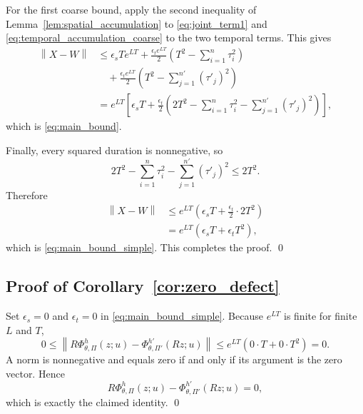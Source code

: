 \documentclass{article}
\theoremstyle{plain}
\theoremstyle{definition}
\theoremstyle{remark}
\newcommand{\PhiOp}{\Phi}
\newcommand{\norm}[1]{\left\lVert #1 \right\rVert}
\begin{document}
For the first coarse bound, apply the second inequality of Lemma~\ref{lem:spatial_accumulation} to \cref{eq:joint_term1} and \cref{eq:temporal_accumulation_coarse} to the two temporal terms. This gives
\begin{align}
\norm{X-W}
&\le
\epsilon_sTe^{LT}
+
\frac{\epsilon_te^{LT}}{2}
\left(T^2-\sum_{i=1}^{n}\tau_i^2\right)
\nonumber\\
&\quad+
\frac{\epsilon_te^{LT}}{2}
\left(T^2-\sum_{j=1}^{n'}(\tau'_j)^2\right)
\nonumber\\
&=
 e^{LT}
 \left[
 \epsilon_sT
 +\frac{\epsilon_t}{2}
 \left(
 2T^2
 -\sum_{i=1}^{n}\tau_i^2
 -\sum_{j=1}^{n'}(\tau'_j)^2
 \right)
 \right],
\end{align}
which is \cref{eq:main_bound}.

Finally, every squared duration is nonnegative, so
\begin{equation}
2T^2
-\sum_{i=1}^{n}\tau_i^2
-\sum_{j=1}^{n'}(\tau'_j)^2
\le 2T^2.
\end{equation}
Therefore
\begin{align}
\norm{X-W}
&\le
 e^{LT}
 \left(\epsilon_sT+\frac{\epsilon_t}{2}\cdot2T^2\right)
\nonumber\\
&=e^{LT}(\epsilon_sT+\epsilon_tT^2),
\end{align}
which is \cref{eq:main_bound_simple}. This completes the proof. \qed

\subsection{Proof of Corollary~\ref{cor:zero_defect}}
\label{app:proof_zero_defect}

Set $\epsilon_s=0$ and $\epsilon_t=0$ in \cref{eq:main_bound_simple}. Because $e^{LT}$ is finite for finite $L$ and $T$,
\begin{equation}
0
\le
\norm{
R\PhiOp^{h}_{\theta,\Pi}(z;u)
-
\PhiOp^{h'}_{\theta,\Pi'}(Rz;u)
}
\le
 e^{LT}(0\cdot T+0\cdot T^2)
=0.
\end{equation}
A norm is nonnegative and equals zero if and only if its argument is the zero vector. Hence
\begin{equation}
R\PhiOp^{h}_{\theta,\Pi}(z;u)
-
\PhiOp^{h'}_{\theta,\Pi'}(Rz;u)
=0,
\end{equation}
which is exactly the claimed identity. \qed
\end{document}
